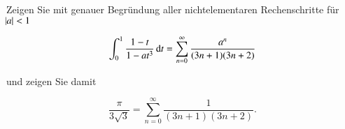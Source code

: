 
\begin{exercise}
  Zeigen Sie mit genauer Begründung aller nichtelementaren Rechenschritte für \linebreak $\abs{a}<1$

  \begin{equation*}
    \int_0^1{\frac{1-t}{1-at^3} \dif t}=\sum_{n=0}^\infty{\frac{a^n}{(3n+1)(3n+2)}}
  \end{equation*}

  und zeigen Sie damit

  \begin{equation*}
    \frac{\pi}{3\sqrt{3}}=\sum_{n=0}^\infty{\frac{1}{(3n+1)(3n+2)}}.
  \end{equation*}
\end{exercise}
